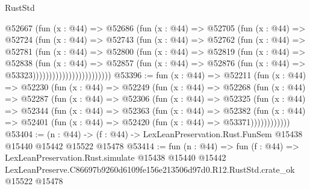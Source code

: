 \begin{lexlean}{RustStd}
\begin{coremodule}
                          @52667
                            (fun (x : @44) =>
                            @52686
                              (fun (x : @44) =>
                              @52705
                                (fun (x : @44) =>
                                @52724
                                  (fun (x : @44) =>
                                  @52743
                                    (fun (x : @44) =>
                                    @52762
                                      (fun (x : @44) =>
                                      @52781
                                        (fun (x : @44) =>
                                        @52800
                                          (fun (x : @44) =>
                                          @52819
                                            (fun (x : @44) =>
                                            @52838
                                              (fun (x : @44) =>
                                              @52857
                                                (fun (x : @44) =>
                                                @52876
                                                  (fun (x : @44) => @53323))))))))))))))))))))))))
@53396 := fun (x : @44) =>
  @52211
    (fun (x : @44) =>
    @52230
      (fun (x : @44) =>
      @52249
        (fun (x : @44) =>
        @52268
          (fun (x : @44) =>
          @52287
            (fun (x : @44) =>
            @52306
              (fun (x : @44) =>
              @52325
                (fun (x : @44) =>
                @52344
                  (fun (x : @44) =>
                  @52363
                    (fun (x : @44) =>
                    @52382
                      (fun (x : @44) =>
                      @52401 (fun (x : @44) => @52420 (fun (x : @44) => @53371))))))))))))
@53404 := (n : @44) ->
  (f : @44) -> LexLeanPreservation.Rust.FunSem @15438 @15440 @15442 @15522 @15478
@53414 := fun (n : @44) =>
  fun (f : @44) =>
  LexLeanPreservation.Rust.simulate
    @15438
    @15440
    @15442
    LexLeanPreserve.C86697b9260d6109fe156e213506d97d0.R12.RustStd.crate_ok
    @15522
    @15478
\end{coremodule}
\end{lexlean}
